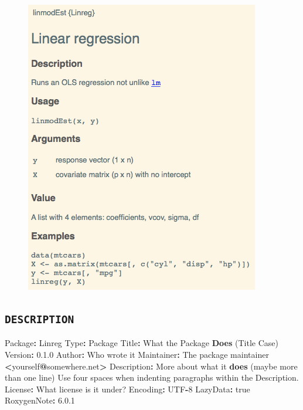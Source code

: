 \documentclass[]{book}
\newenvironment{Shaded}{\begin{snugshade}}{\end{snugshade}}
\newcommand{\KeywordTok}[1]{\textcolor[rgb]{0.13,0.29,0.53}{\textbf{#1}}}
\newcommand{\DecValTok}[1]{\textcolor[rgb]{0.00,0.00,0.81}{#1}}
\newcommand{\FloatTok}[1]{\textcolor[rgb]{0.00,0.00,0.81}{#1}}
\newcommand{\StringTok}[1]{\textcolor[rgb]{0.31,0.60,0.02}{#1}}
\newcommand{\OperatorTok}[1]{\textcolor[rgb]{0.81,0.36,0.00}{\textbf{#1}}}
\newcommand{\NormalTok}[1]{#1}
\theoremstyle{definition}
\theoremstyle{definition}
\theoremstyle{definition}
\theoremstyle{remark}
\begin{document}
\begin{figure}

{\centering \includegraphics{images/ch3_formatted_help} 

}

\end{figure}

\subsection{\texorpdfstring{\texttt{DESCRIPTION}}{DESCRIPTION}}\label{description}

\begin{Shaded}
\begin{Highlighting}[]
\NormalTok{Package}\OperatorTok{:}\StringTok{ }\NormalTok{Linreg}
\NormalTok{Type}\OperatorTok{:}\StringTok{ }\NormalTok{Package}
\NormalTok{Title}\OperatorTok{:}\StringTok{ }\NormalTok{What the Package }\KeywordTok{Does}\NormalTok{ (Title Case)}
\NormalTok{Version}\OperatorTok{:}\StringTok{ }\FloatTok{0.1}\NormalTok{.}\DecValTok{0}
\NormalTok{Author}\OperatorTok{:}\StringTok{ }\NormalTok{Who wrote it}
\NormalTok{Maintainer}\OperatorTok{:}\StringTok{ }\NormalTok{The package maintainer }\OperatorTok{<}\NormalTok{yourself}\OperatorTok{@}\NormalTok{somewhere.net}\OperatorTok{>}
\NormalTok{Description}\OperatorTok{:}\StringTok{ }\NormalTok{More about what it }\KeywordTok{does}\NormalTok{ (maybe more than one line)}
\NormalTok{    Use four spaces when indenting paragraphs within the Description.}
\NormalTok{License}\OperatorTok{:}\StringTok{ }\NormalTok{What license is it under?}
\NormalTok{Encoding}\OperatorTok{:}\StringTok{ }\NormalTok{UTF}\OperatorTok{-}\DecValTok{8}
\NormalTok{LazyData}\OperatorTok{:}\StringTok{ }\NormalTok{true}
\NormalTok{RoxygenNote}\OperatorTok{:}\StringTok{ }\FloatTok{6.0}\NormalTok{.}\DecValTok{1}
\end{Highlighting}
\end{Shaded}
\end{document}
